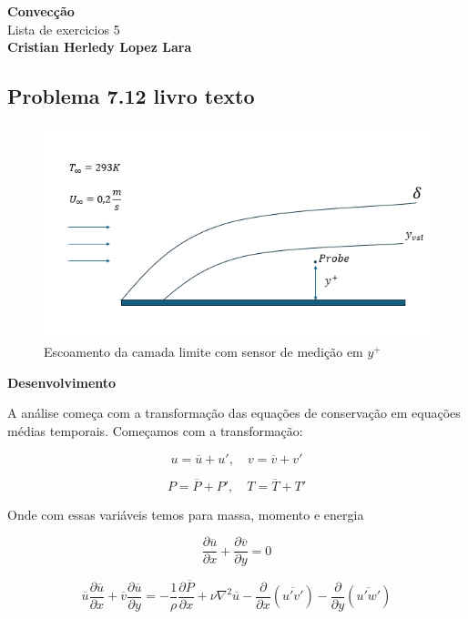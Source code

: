 \documentclass[12pt]{article}
\title{}
\author{}
\begin{document}
\begin{center}
	{\tiny {\normalsize {\large \textbf{Convecção}\\ Lista de exercicios 5\\
	
	\textbf{Cristian Herledy Lopez Lara}}}}
\end{center}

\subsection*{Problema 7.12 livro texto}

\begin{figure}[H]
	\centering
	\includegraphics[width=.65\textwidth]{Figures/1_1}
	\caption{Escoamento da camada limite com sensor de medição em $y^+$}
\end{figure}

\textbf{Desenvolvimento} 

A análise começa com a transformação das equações de conservação em equações médias temporais. Começamos com a transformação:

\begin{equation}
	u = \overline{u} + u', \quad v = \overline{v} + v'
\end{equation}

\begin{equation}
	P = \overline{P} + P', \quad T = \overline{T} + T'
\end{equation}

Onde com essas variáveis temos para massa, momento e energia

\begin{equation}
	\frac{\partial \overline{u}}{\partial x} + \frac{\partial \overline{v}}{\partial y} = 0
\end{equation}

\begin{equation}
	\overline{u} \frac{\partial \overline{u}}{\partial x} + \overline{v} \frac{\partial \overline{u}}{\partial y}   = - \frac{1}{\rho} \frac{\partial \overline{P}}{\partial x} + \nu \nabla^2 \overline{u} - \frac{\partial}{\partial x} \left( \overline{u'v'} \right) - \frac{\partial}{\partial y} \left( \overline{u'w'} \right)
\end{equation}
\end{document}
